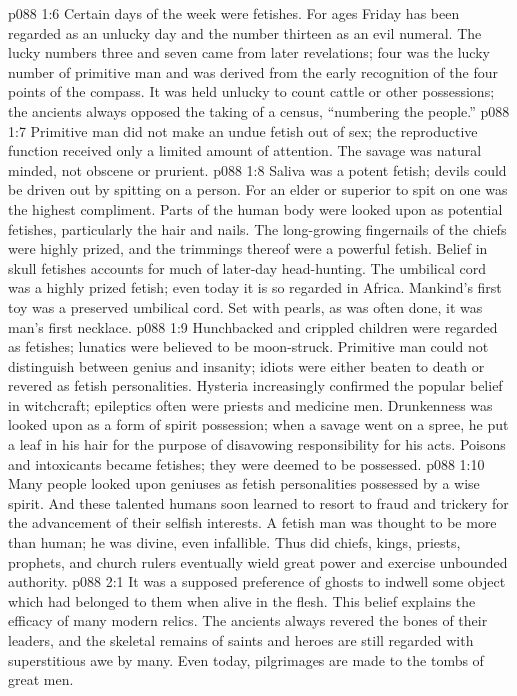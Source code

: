\vs p088 1:6 Certain days of the week were fetishes. For ages Friday has been regarded as an unlucky day and the number thirteen as an evil numeral. The lucky numbers three and seven came from later revelations; four was the lucky number of primitive man and was derived from the early recognition of the four points of the compass. It was held unlucky to count cattle or other possessions; the ancients always opposed the taking of a census, “numbering the people.”
\vs p088 1:7 Primitive man did not make an undue fetish out of sex; the reproductive function received only a limited amount of attention. The savage was natural minded, not obscene or prurient.
\vs p088 1:8 Saliva was a potent fetish; devils could be driven out by spitting on a person. For an elder or superior to spit on one was the highest compliment. Parts of the human body were looked upon as potential fetishes, particularly the hair and nails. The long\hyp{}growing fingernails of the chiefs were highly prized, and the trimmings thereof were a powerful fetish. Belief in skull fetishes accounts for much of later\hyp{}day head\hyp{}hunting. The umbilical cord was a highly prized fetish; even today it is so regarded in Africa. Mankind’s first toy was a preserved umbilical cord. Set with pearls, as was often done, it was man’s first necklace.
\vs p088 1:9 Hunchbacked and crippled children were regarded as fetishes; lunatics were believed to be moon\hyp{}struck. Primitive man could not distinguish between genius and insanity; idiots were either beaten to death or revered as fetish personalities. Hysteria increasingly confirmed the popular belief in witchcraft; epileptics often were priests and medicine men. Drunkenness was looked upon as a form of spirit possession; when a savage went on a spree, he put a leaf in his hair for the purpose of disavowing responsibility for his acts. Poisons and intoxicants became fetishes; they were deemed to be possessed.\plusone
\vs p088 1:10 Many people looked upon geniuses as fetish personalities possessed by a wise spirit. And these talented humans soon learned to resort to fraud and trickery for the advancement of their selfish interests. A fetish man was thought to be more than human; he was divine, even infallible. Thus did chiefs, kings, priests, prophets, and church rulers eventually wield great power and exercise unbounded authority.
\vs p088 2:1 It was a supposed preference of ghosts to indwell some object which had belonged to them when alive in the flesh. This belief explains the efficacy of many modern relics. The ancients always revered the bones of their leaders, and the skeletal remains of saints and heroes are still regarded with superstitious awe by many. Even today, pilgrimages are made to the tombs of great men.
